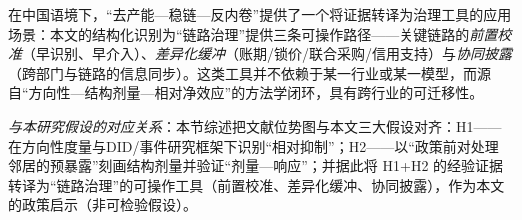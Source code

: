 在中国语境下，“去产能—稳链—反内卷”提供了一个将证据转译为治理工具的应用场景：本文的结构化识别为“链路治理”提供三条可操作路径——关键链路的\emph{前置校准}（早识别、早介入）、\emph{差异化缓冲}（账期/锁价/联合采购/信用支持）与\emph{协同披露}（跨部门与链路的信息同步）。这类工具并不依赖于某一行业或某一模型，而源自“方向性—结构剂量—相对净效应”的方法学闭环，具有跨行业的可迁移性。

\noindent\textit{与本研究假设的对应关系}：本节综述把文献位势图与本文三大假设对齐：H1——在方向性度量与DID/事件研究框架下识别“相对抑制”；H2——以“政策前对处理邻居的预暴露”刻画结构剂量并验证“剂量—响应”；并据此将 H1+H2 的经验证据转译为“链路治理”的可操作工具（前置校准、差异化缓冲、协同披露），作为本文的政策启示（非可检验假设）。
